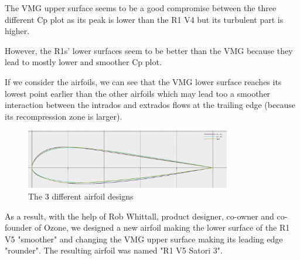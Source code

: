 The VMG upper surface seems to be a good compromise between the three different Cp plot as its peak is lower than the R1 V4 but its turbulent part is higher.

However, the R1s' lower surfaces seem to be better than the VMG because they lead to mostly lower and smoother Cp plot.

\vspace{1cm}

If we consider the airfoils, we can see that the VMG lower surface reaches its lowest point earlier than the other airfoils which may lead too a smoother interaction between the intrados and extrados flows at the trailing edge (because its recompression zone is larger).

\begin{figure}[H]
    \centering
    \includegraphics[width=0.8\textwidth]{figures/2D steady simulations/airfoil design/foils design.png}
    \caption{The 3 different airfoil designs}
    \label{fig:The_3_different_airfoil_designs}
\end{figure}

As a result, with the help of Rob Whittall, product designer, co-owner and co-founder of Ozone, we designed a new airfoil making the lower surface of the R1 V5 "smoother" and changing the VMG upper surface making its leading edge "rounder". The resulting airfoil was named "R1 V5 Satori 3". 


